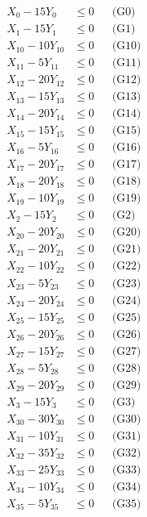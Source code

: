 \documentclass[a4paper,10pt]{article}
\begin{document}
\allowdisplaybreaks
{\small\begin{align}
X_{0} - 15Y_{0} &\leq 0 && \text{(G0)} \\
X_{1} - 15Y_{1} &\leq 0 && \text{(G1)} \\
X_{10} - 10Y_{10} &\leq 0 && \text{(G10)} \\
X_{11} - 5Y_{11} &\leq 0 && \text{(G11)} \\
X_{12} - 20Y_{12} &\leq 0 && \text{(G12)} \\
X_{13} - 15Y_{13} &\leq 0 && \text{(G13)} \\
X_{14} - 20Y_{14} &\leq 0 && \text{(G14)} \\
X_{15} - 15Y_{15} &\leq 0 && \text{(G15)} \\
X_{16} - 5Y_{16} &\leq 0 && \text{(G16)} \\
X_{17} - 20Y_{17} &\leq 0 && \text{(G17)} \\
X_{18} - 20Y_{18} &\leq 0 && \text{(G18)} \\
X_{19} - 10Y_{19} &\leq 0 && \text{(G19)} \\
X_{2} - 15Y_{2} &\leq 0 && \text{(G2)} \\
X_{20} - 20Y_{20} &\leq 0 && \text{(G20)} \\
X_{21} - 20Y_{21} &\leq 0 && \text{(G21)} \\
X_{22} - 10Y_{22} &\leq 0 && \text{(G22)} \\
X_{23} - 5Y_{23} &\leq 0 && \text{(G23)} \\
X_{24} - 20Y_{24} &\leq 0 && \text{(G24)} \\
X_{25} - 15Y_{25} &\leq 0 && \text{(G25)} \\
X_{26} - 20Y_{26} &\leq 0 && \text{(G26)} \\
\allowbreak
X_{27} - 15Y_{27} &\leq 0 && \text{(G27)} \\
X_{28} - 5Y_{28} &\leq 0 && \text{(G28)} \\
X_{29} - 20Y_{29} &\leq 0 && \text{(G29)} \\
X_{3} - 15Y_{3} &\leq 0 && \text{(G3)} \\
X_{30} - 30Y_{30} &\leq 0 && \text{(G30)} \\
X_{31} - 10Y_{31} &\leq 0 && \text{(G31)} \\
X_{32} - 35Y_{32} &\leq 0 && \text{(G32)} \\
X_{33} - 25Y_{33} &\leq 0 && \text{(G33)} \\
X_{34} - 10Y_{34} &\leq 0 && \text{(G34)} \\
X_{35} - 5Y_{35} &\leq 0 && \text{(G35)} \\

\end{align}}
\end{document}
